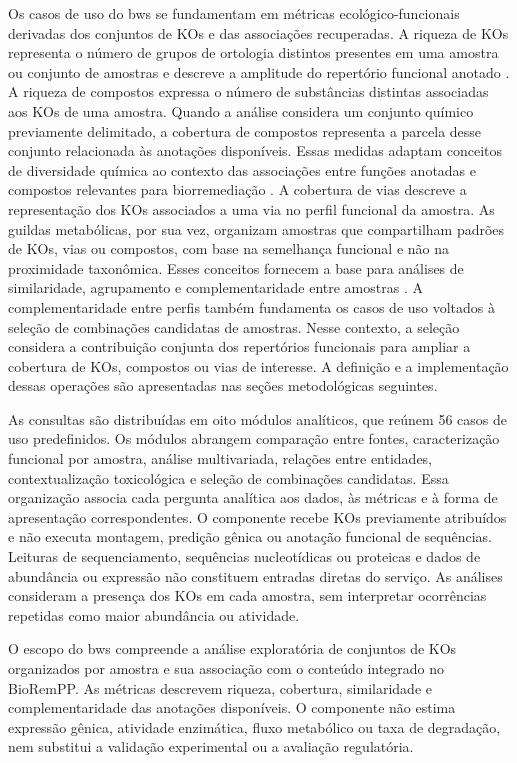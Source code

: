 Os casos de uso do \gls{bws} se fundamentam em métricas
ecológico-funcionais derivadas dos conjuntos de KOs e das associações
recuperadas. A riqueza de KOs representa o número de grupos de ortologia
distintos presentes em uma amostra ou conjunto de amostras e descreve a
amplitude do repertório funcional anotado \cite{armitage2012,arai2018,reynolds2023}. A riqueza de compostos expressa o número de substâncias distintas associadas
aos KOs de uma amostra. Quando a análise considera um conjunto químico
previamente delimitado, a cobertura de compostos representa a parcela desse
conjunto relacionada às anotações disponíveis. Essas medidas adaptam conceitos
de diversidade química ao contexto das associações entre funções anotadas e
compostos relevantes para biorremediação \cite{wetzel2020,petren2024}. A cobertura de vias descreve a representação dos KOs associados a uma via no
perfil funcional da amostra. As guildas metabólicas, por sua vez, organizam
amostras que compartilham padrões de KOs, vias ou compostos, com base na
semelhança funcional e não na proximidade taxonômica. Esses conceitos fornecem
a base para análises de similaridade, agrupamento e complementaridade entre
amostras \cite{arai2018,reynolds2023}. A complementaridade entre perfis também fundamenta os casos de uso voltados à
seleção de combinações candidatas de amostras. Nesse contexto, a seleção
considera a contribuição conjunta dos repertórios funcionais para ampliar a
cobertura de KOs, compostos ou vias de interesse. A definição e a
implementação dessas operações são apresentadas nas seções metodológicas
seguintes.

As consultas são distribuídas em oito módulos analíticos, que reúnem 56 casos
de uso predefinidos. Os módulos abrangem comparação entre fontes,
caracterização funcional por amostra, análise multivariada, relações entre
entidades, contextualização toxicológica e seleção de combinações candidatas.
Essa organização associa cada pergunta analítica aos dados, às métricas e à
forma de apresentação correspondentes. O componente recebe KOs previamente atribuídos e não executa montagem,
predição gênica ou anotação funcional de sequências. Leituras de
sequenciamento, sequências nucleotídicas ou proteicas e dados de abundância ou
expressão não constituem entradas diretas do serviço. As análises consideram
a presença dos KOs em cada amostra, sem interpretar ocorrências repetidas como
maior abundância ou atividade.

O escopo do \gls{bws} compreende a análise exploratória de conjuntos de KOs
organizados por amostra e sua associação com o conteúdo integrado no
BioRemPP. As métricas descrevem riqueza, cobertura, similaridade e
complementaridade das anotações disponíveis. O componente não estima
expressão gênica, atividade enzimática, fluxo metabólico ou taxa de degradação,
nem substitui a validação experimental ou a avaliação regulatória.


